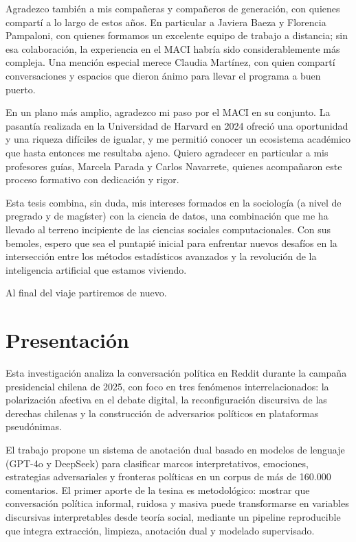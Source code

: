 \documentclass[
  letterpaper,
  numbers=noendperiod,
  fontsize=11pt,
  DIV=12,
  titlepage=false]{scrreprt}
\begin{document}
Agradezco también a mis compañeras y compañeros de generación, con
quienes compartí a lo largo de estos años. En particular a Javiera Baeza
y Florencia Pampaloni, con quienes formamos un excelente equipo de
trabajo a distancia; sin esa colaboración, la experiencia en el MACI
habría sido considerablemente más compleja. Una mención especial merece
Claudia Martínez, con quien compartí conversaciones y espacios que
dieron ánimo para llevar el programa a buen puerto.

En un plano más amplio, agradezco mi paso por el MACI en su conjunto. La
pasantía realizada en la Universidad de Harvard en 2024 ofreció una
oportunidad y una riqueza difíciles de igualar, y me permitió conocer un
ecosistema académico que hasta entonces me resultaba ajeno. Quiero
agradecer en particular a mis profesores guías, Marcela Parada y Carlos
Navarrete, quienes acompañaron este proceso formativo con dedicación y
rigor.

Esta tesis combina, sin duda, mis intereses formados en la sociología (a
nivel de pregrado y de magíster) con la ciencia de datos, una
combinación que me ha llevado al terreno incipiente de las ciencias
sociales computacionales. Con sus bemoles, espero que sea el puntapié
inicial para enfrentar nuevos desafíos en la intersección entre los
métodos estadísticos avanzados y la revolución de la inteligencia
artificial que estamos viviendo.

Al final del viaje partiremos de nuevo.

\newpage


\chapter*{Presentación}\label{presentaciuxf3n}


Esta investigación analiza la conversación política en Reddit durante la
campaña presidencial chilena de 2025, con foco en tres fenómenos
interrelacionados: la polarización afectiva en el debate digital, la
reconfiguración discursiva de las derechas chilenas y la construcción de
adversarios políticos en plataformas pseudónimas.

El trabajo propone un sistema de anotación dual basado en modelos de
lenguaje (GPT-4o y DeepSeek) para clasificar marcos interpretativos,
emociones, estrategias adversariales y fronteras políticas en un corpus
de más de 160.000 comentarios. El primer aporte de la tesina es
metodológico: mostrar que conversación política informal, ruidosa y
masiva puede transformarse en variables discursivas interpretables desde
teoría social, mediante un pipeline reproducible que integra extracción,
limpieza, anotación dual y modelado supervisado.
\end{document}
